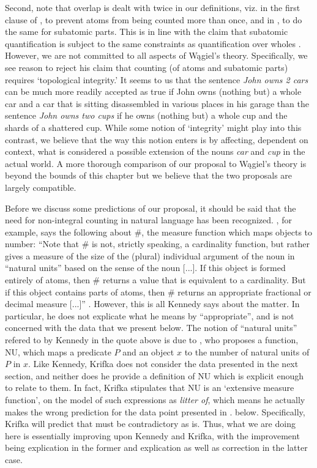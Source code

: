 \documentclass[output=paper]{langscibook}
\begin{document}
Second, note that overlap is dealt with twice in our definitions, viz. in the first clause of , to prevent atoms from being counted more than once, and in , to do the same for subatomic parts. This is in line with the claim that subatomic quantification is subject to the same constraints as quantification over wholes \citep{wagiel2018thesis, wagiel2019SuB}. However, we are not committed to all aspects of W\k{a}giel's theory. Specifically, we see reason to reject his claim that counting (of atoms and subatomic parts) requires `topological integrity.' It seems to us that the sentence \textit{John owns 2 cars} can be much more readily accepted as true if John owns (nothing but) a whole car and a car that is sitting disassembled in various places in his garage than the sentence \textit{John owns two cups} if he owns (nothing but) a whole cup and the shards of a shattered cup. While some notion of `integrity' might play into this contrast, we believe that the way this notion enters is by affecting, dependent on context, what is considered a possible extension of the nouns \textit{car} and \textit{cup} in the actual world. A more thorough comparison of our proposal to W\k{a}giel's theory is beyond the bounds of this chapter but we believe that the two proposals are largely compatible.

Before we discuss some predictions of our proposal, it should be said that the need for non-integral counting in natural language has been recognized. \citet{kennedy2015de-fregean}, for example, says the following about \#, the measure function which maps objects to number: ``Note that \# is not, strictly speaking, a cardinality function, but rather gives a measure of the size of the (plural) individual argument of the noun in ``natural units'' based on the sense of the noun [...]. If this object is formed entirely of atoms, then \# returns a value that is equivalent to a cardinality. But if this object contains parts of atoms, then \# returns an appropriate fractional or decimal measure [...]'' \citep[][footnote 1]{kennedy2015de-fregean}. However, this is all Kennedy says about the matter. In particular, he does not explicate what he means by ``appropriate'', and is not concerned with the data that we present below. The notion of ``natural units'' refered to by Kennedy in the quote above is due to \citet{Krifka:1989}, who proposes a function, NU, which maps a predicate $P$ and an object $x$ to the number of natural units of $P$ in $x$. Like Kennedy, Krifka does not consider the data presented in the next section, and neither does he provide a definition of NU which is explicit enough to relate to them. In fact, Krifka stipulates that NU is an `extensive measure function', on the model of such expressions as \textit{litter of}, which means he actually makes the wrong prediction for the data point presented in . below. Specifically, Krifka will predict that  must be contradictory as  is. Thus, what we are doing here is essentially improving upon Kennedy and Krifka, with the improvement being explication in the former and explication as well as correction in the latter case.
\end{document}
